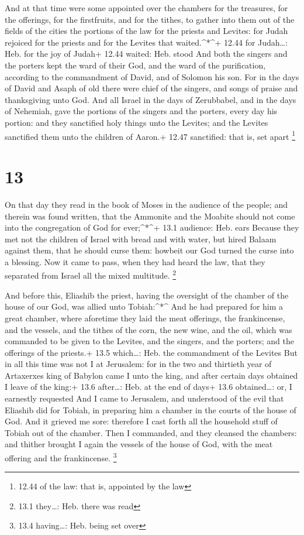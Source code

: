  And at that time were some appointed over the chambers for
the treasures, for the offerings, for the firstfruits, and for the
tithes, to gather into them out of the fields of the cities the portions
of the law for the priests and Levites: for Judah rejoiced for the
priests and for the Levites that waited.\^{}*\^{}+ 12.44 for
Judah\ldots: Heb. for the joy of Judah+ 12.44 waited: Heb. stood
 And both the singers and the porters kept the ward of
their God, and the ward of the purification, according to the
commandment of David, and of Solomon his son.  For in the
days of David and Asaph of old there were chief of the singers, and
songs of praise and thanksgiving unto God.  And all Israel
in the days of Zerubbabel, and in the days of Nehemiah, gave the
portions of the singers and the porters, every day his portion: and they
sanctified holy things unto the Levites; and the Levites sanctified them
unto the children of Aaron.+ 12.47 sanctified: that is, set apart
\footnote{12.44 of the law: that is, appointed by the law}

\hypertarget{section-12}{%
\section{13}\label{section-12}}

 On that day they read in the book of Moses in the audience
of the people; and therein was found written, that the Ammonite and the
Moabite should not come into the congregation of God for ever;\^{}*\^{}+
13.1 audience: Heb. ears  Because they met not the children
of Israel with bread and with water, but hired Balaam against them, that
he should curse them: howbeit our God turned the curse into a blessing.
 Now it came to pass, when they had heard the law, that they
separated from Israel all the mixed multitude. \footnote{13.1
  they\ldots: Heb. there was read}

 And before this, Eliashib the priest, having the oversight
of the chamber of the house of our God, was allied unto Tobiah:\^{}*\^{}
 And he had prepared for him a great chamber, where
aforetime they laid the meat offerings, the frankincense, and the
vessels, and the tithes of the corn, the new wine, and the oil, which
was commanded to be given to the Levites, and the singers, and the
porters; and the offerings of the priests.+ 13.5 which\ldots: Heb. the
commandment of the Levites  But in all this time was not I
at Jerusalem: for in the two and thirtieth year of Artaxerxes king of
Babylon came I unto the king, and after certain days obtained I leave of
the king:+ 13.6 after\ldots: Heb. at the end of days+ 13.6
obtained\ldots: or, I earnestly requested  And I came to
Jerusalem, and understood of the evil that Eliashib did for Tobiah, in
preparing him a chamber in the courts of the house of God. 
And it grieved me sore: therefore I cast forth all the household stuff
of Tobiah out of the chamber.  Then I commanded, and they
cleansed the chambers: and thither brought I again the vessels of the
house of God, with the meat offering and the frankincense. \footnote{13.4
  having\ldots: Heb. being set over}

